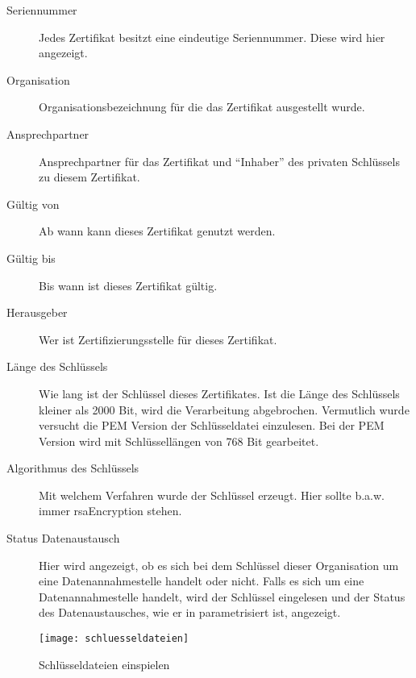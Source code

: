 \begin{description}
\item[Seriennummer]
Jedes Zertifikat besitzt eine eindeutige Seriennummer. Diese wird hier
angezeigt.

\item[Organisation]
Organisationsbezeichnung für die das Zertifikat ausgestellt wurde.

\item[Ansprechpartner]
Ansprechpartner für das Zertifikat und ``Inhaber'' des privaten Schlüssels
zu diesem Zertifikat.

\item[Gültig von]
Ab wann kann dieses Zertifikat genutzt werden.

\item[Gültig bis]
Bis wann ist dieses Zertifikat gültig.

\item[Herausgeber]
Wer ist Zertifizierungsstelle für dieses Zertifikat.

\item[Länge des Schlüssels]
Wie lang ist der Schlüssel dieses Zertifikates. Ist die Länge des Schlüssels
kleiner als 2000 Bit, wird die Verarbeitung abgebrochen. Vermutlich wurde
versucht die PEM Version der Schlüsseldatei einzulesen. Bei der PEM Version
wird mit Schlüssellängen von 768 Bit gearbeitet.

\item[Algorithmus des Schlüssels]
Mit welchem Verfahren wurde der Schlüssel erzeugt. Hier sollte b.a.w. immer
rsaEncryption stehen.

\item[Status Datenaustausch]
Hier wird angezeigt, ob es sich bei dem Schlüssel dieser Organisation
um eine Datenannahmestelle
handelt oder nicht. Falls es sich um eine Datenannahmestelle handelt, wird
der Schlüssel eingelesen und der Status des Datenaustausches, wie er in
\tinyHeb\/ parametrisiert ist, angezeigt.

\end{description}

\begin{figure}[H]
\centering
\texttt{[image: schluesseldateien]}
\caption{Schlüsseldateien einspielen\label{schluesseldateien:fig}}
\end{figure}



